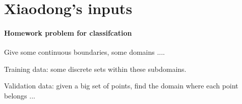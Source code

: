 \section{Xiaodong's inputs}
\paragraph{Homework problem for classifcation}

Give some continuous boundaries, some domains .... 

Training data:  some discrete sets within these subdomains. 

Validation data:  given a big set of points, find the domain where each point belongs ...
